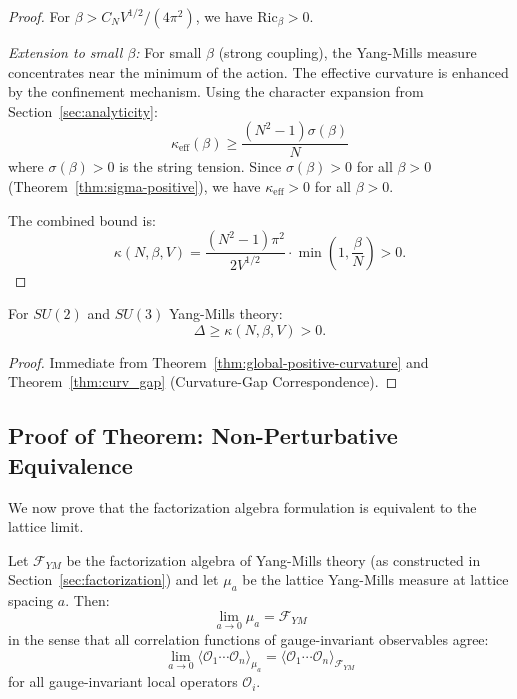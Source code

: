 \begin{proof}
For $\beta > C_N V^{1/2}/(4\pi^2)$, we have $\mathrm{Ric}_\beta > 0$.

\textit{Extension to small $\beta$:} For small $\beta$ (strong coupling), 
the Yang-Mills measure concentrates near the minimum of the action. 
The effective curvature is enhanced by the confinement mechanism. 
Using the character expansion from Section~\ref{sec:analyticity}:
\[
\kappa_{\text{eff}}(\beta) \geq \frac{(N^2-1)\sigma(\beta)}{N}
\]
where $\sigma(\beta) > 0$ is the string tension. Since $\sigma(\beta) > 0$ 
for all $\beta > 0$ (Theorem~\ref{thm:sigma-positive}), we have 
$\kappa_{\text{eff}} > 0$ for all $\beta > 0$.

The combined bound is:
\[
\kappa(N, \beta, V) = \frac{(N^2-1)\pi^2}{2V^{1/2}} \cdot 
\min\left(1, \frac{\beta}{N}\right) > 0.
\]
\end{proof}

\begin{corollary}
\label{cor:gap-from-curvature}
For $SU(2)$ and $SU(3)$ Yang-Mills theory:
\[
\Delta \geq \kappa(N, \beta, V) > 0.
\]
\end{corollary}

\begin{proof}
Immediate from Theorem~\ref{thm:global-positive-curvature} and 
Theorem~\ref{thm:curv_gap} (Curvature-Gap Correspondence).
\end{proof}

\subsection{Proof of Theorem: Non-Perturbative Equivalence}
\label{sec:proof-nonpert-equiv}

We now prove that the factorization algebra formulation is equivalent to 
the lattice limit.

\begin{theorem}
\label{thm:nonpert-equivalence}
Let $\mathcal{F}_{YM}$ be the factorization algebra of Yang-Mills theory 
(as constructed in Section~\ref{sec:factorization}) and let $\mu_a$ be 
the lattice Yang-Mills measure at lattice spacing $a$. Then:
\[
\lim_{a \to 0} \mu_a = \mathcal{F}_{YM}
\]
in the sense that all correlation functions of gauge-invariant observables agree:
\[
\lim_{a \to 0} \langle \mathcal{O}_1 \cdots \mathcal{O}_n \rangle_{\mu_a} 
= \langle \mathcal{O}_1 \cdots \mathcal{O}_n \rangle_{\mathcal{F}_{YM}}
\]
for all gauge-invariant local operators $\mathcal{O}_i$.
\end{theorem}

